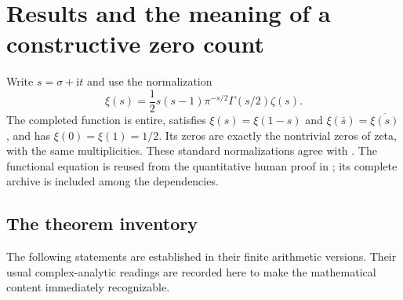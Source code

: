 \documentclass[11pt,letterpaper]{article}
\theoremstyle{definition}
\newcommand{\ii}{\mathrm i}\newcommand{\ee}{\mathrm e}
\begin{document}
\section{Results and the meaning of a constructive zero count}
\label{sec:results}

Write $s=\sigma+\ii t$ and use the normalization
\begin{equation}
 \xi(s)=\frac12s(s-1)\pi^{-s/2}\Gamma(s/2)\zeta(s).
 \label{eq:xi-definition}
\end{equation}
The completed function is entire, satisfies
$\xi(s)=\xi(1-s)$ and $\xi(\bar s)=\overline{\xi(s)}$, and has
$\xi(0)=\xi(1)=1/2$. Its zeros are exactly the nontrivial zeros of zeta,
with the same multiplicities. These standard normalizations agree with
\cite{DLMFreflection,DLMFzeros}. The functional equation is reused from
the quantitative human proof in \cite{RepoFE}; its complete archive is
included among the dependencies.

\subsection{The theorem inventory}
The following statements are established in their finite arithmetic
versions. Their usual complex-analytic readings are recorded here to make
the mathematical content immediately recognizable.
\end{document}
